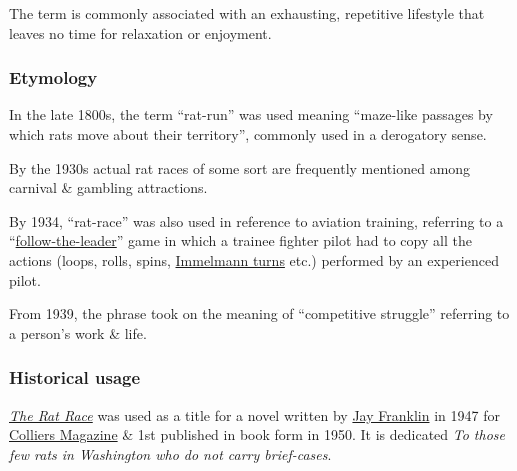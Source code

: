 \documentclass{article}
\begin{document}
The term is commonly associated with an exhausting, repetitive lifestyle that leaves no time for relaxation or enjoyment.

\subsubsection{Etymology}
In the late 1800s, the term ``rat-run'' was used meaning ``maze-like passages by which rats move about their territory'', commonly used in a derogatory sense.

By the 1930s actual rat races of some sort are frequently mentioned among carnival \& gambling attractions.

By 1934, ``rat-race'' was also used in reference to aviation training, referring to a ``\href{https://en.wikipedia.org/wiki/Follow-the-leader}{follow-the-leader}'' game in which a trainee fighter pilot had to copy all the actions (loops, rolls, spins, \href{https://en.wikipedia.org/wiki/Immelmann_turn}{Immelmann turns} etc.) performed by an experienced pilot.

From 1939, the phrase took on the meaning of ``competitive struggle'' referring to a person's work \& life.

\subsubsection{Historical usage}
\href{https://en.wikipedia.org/wiki/The_Rat_Race_(novel)}{\it The Rat Race} was used as a title for a novel written by \href{https://en.wikipedia.org/wiki/Jay_Franklin}{\sc Jay Franklin} in 1947 for \href{https://en.wikipedia.org/wiki/Colliers_Magazine}{Colliers Magazine} \& 1st published in book form in 1950. It is dedicated {\it To those few rats in Washington who do not carry brief-cases}.
\end{document}
